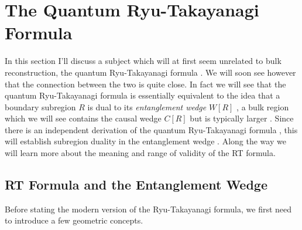 \documentclass[toc]{PoS}
\begin{document}
\section{The Quantum Ryu-Takayanagi Formula}\label{rtsec}
In this section I'll discuss a subject which will at first seem unrelated to bulk reconstruction, the quantum Ryu-Takayanagi formula \cite{Ryu:2006bv,Hubeny:2007xt,Faulkner:2013ana}. We will soon see however that the connection between the two is quite close.  In fact we will see that the quantum Ryu-Takayanagi formula is essentially equivalent to the idea that a boundary subregion $R$ is dual to its \textit{entanglement wedge} $W[R]$ \cite{Harlow:2016vwg}, a bulk region which we will see contains the causal wedge $C[R]$ but is typically larger \cite{Wall:2012uf,Headrick:2014cta}.  Since there is an independent derivation of the quantum Ryu-Takayanagi formula \cite{Lewkowycz:2013nqa,Faulkner:2013ana,Dong:2013qoa,Dong:2016hjy}, this will establish subregion duality in the entanglement wedge \cite{Dong:2016eik,Harlow:2016vwg}. Along the way we will learn more about the meaning and range of validity of the RT formula.   

\subsection{RT Formula and the Entanglement Wedge}\label{RTsec}
Before stating the modern version of the Ryu-Takayanagi formula, we first need to introduce a few geometric concepts.
\end{document}
